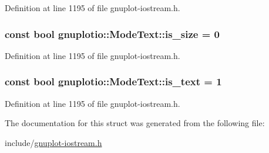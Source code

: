 Definition at line 1195 of file gnuplot-\/iostream.\+h.

\subsubsection[{\texorpdfstring{is\+\_\+size}{is_size}}]{\setlength{\rightskip}{0pt plus 5cm}const bool gnuplotio\+::\+Mode\+Text\+::is\+\_\+size = 0\hspace{0.3cm}{\ttfamily [static]}}\hypertarget{structgnuplotio_1_1_mode_text_aaffc1e7bb26c6d1404cb5a3f03f13be9}{}\label{structgnuplotio_1_1_mode_text_aaffc1e7bb26c6d1404cb5a3f03f13be9}


Definition at line 1195 of file gnuplot-\/iostream.\+h.

\subsubsection[{\texorpdfstring{is\+\_\+text}{is_text}}]{\setlength{\rightskip}{0pt plus 5cm}const bool gnuplotio\+::\+Mode\+Text\+::is\+\_\+text = 1\hspace{0.3cm}{\ttfamily [static]}}\hypertarget{structgnuplotio_1_1_mode_text_a7083d8977c354a036a7c542bf99d3d52}{}\label{structgnuplotio_1_1_mode_text_a7083d8977c354a036a7c542bf99d3d52}


Definition at line 1195 of file gnuplot-\/iostream.\+h.



The documentation for this struct was generated from the following file\+:\begin{DoxyCompactItemize}
\item 
include/\hyperlink{gnuplot-iostream_8h}{gnuplot-\/iostream.\+h}\end{DoxyCompactItemize}
